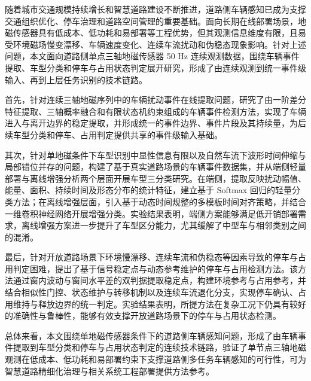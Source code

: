 随着城市交通规模持续增长和智慧道路建设不断推进，道路侧车辆感知已成为支撑交通组织优化、停车治理和道路空间管理的重要基础。面向长期在线部署场景，地磁传感器具有低成本、低功耗和易部署等工程优势，但其观测信息维度有限，且易受环境磁场慢变漂移、车辆速度变化、连续车流扰动和伪稳态现象影响。针对上述问题，本文面向道路侧单点三轴地磁传感器 50 Hz 连续观测数据，围绕车辆事件提取、车型分类和停车与占用状态判定展开研究，形成了由连续观测到统一事件级输入、再到上层任务识别的技术链路。

首先，针对连续三轴地磁序列中的车辆扰动事件在线提取问题，研究了由一阶差分特征提取、三轴概率融合和有限状态机约束组成的车辆事件检测方法，实现了车辆进入与离开边界的稳定提取，并形成统一的事件边界、事件片段及其持续量，为后续车型分类和停车、占用判定提供共享的事件级输入基础。

其次，针对单地磁条件下车型识别中显性信息有限以及自然车流下波形时间伸缩与局部错位并存的问题，构建了基于真实道路场景的车辆事件数据集，并从端侧轻量部署与离线增强分析两个层面开展车型三分类研究。在端侧，提取反映扰动幅值、能量、面积、持续时间及形态分布的统计特征，建立基于 Softmax 回归的轻量分类方法；在离线增强层面，引入基于动态时间规整的多模板时间对齐策略，并结合一维卷积神经网络开展增强分类。实验结果表明，端侧方案能够满足低开销部署需求，离线增强方案进一步提升了车型区分能力，尤其缓解了中型车与相邻类别之间的混淆。

最后，针对开放道路场景下环境慢漂移、连续车流和伪稳态等因素导致的停车与占用判定困难，提出了基于信号稳定点与动态参考维护的停车与占用检测方法。该方法通过窗内波动与窗间水平差的双判据提取稳定点，构建环境参考与占用参考，并结合相似性门控、状态维护与转移机制以及连续车流退化分支，实现停车确认、占用维持与释放边界的统一判定。实验结果表明，所提方法在复杂工况下仍具有较好的准确性与鲁棒性，能够有效支撑开放道路场景下的停车与占用状态检测。

总体来看，本文围绕单地磁传感器条件下的道路侧车辆感知问题，形成了由车辆事件提取到车型分类和停车与占用状态判定的连续技术链路，验证了单节点三轴地磁观测在低成本、低功耗和易部署约束下支撑道路侧多任务车辆感知的可行性，可为智慧道路精细化治理与相关系统工程部署提供方法参考。
